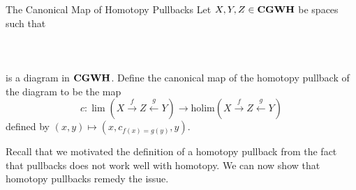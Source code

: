 \documentclass[a4paper]{article}
\begin{document}
\begin{defn}{The Canonical Map of Homotopy Pullbacks}{} Let $X,Y,Z\in\bold{CGWH}$ be spaces such that \\~\\
\\~\\
is a diagram in $\bold{CGWH}$. Define the canonical map of the homotopy pullback of the diagram to be the map $$c:\lim(X\overset{f}{\rightarrow}Z\overset{g}{\leftarrow}Y)\to\text{holim}(X\overset{f}{\rightarrow}Z\overset{g}{\leftarrow}Y)$$ defined by $(x,y)\mapsto(x,c_{f(x)=g(y)},y)$. 
\end{defn}

Recall that we motivated the definition of a homotopy pullback from the fact that pullbacks does not work well with homotopy. We can now show that homotopy pullbacks remedy the issue. 
\end{document}

